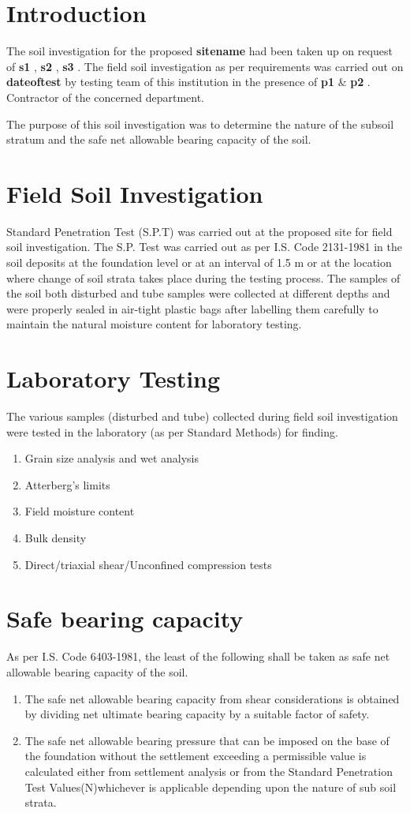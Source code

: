 \documentclass{set}
\begin{document}
\section{Introduction}
The soil investigation for the proposed \textbf{
{{sitename}}
} had been taken up on request of \textbf{
{{s1}}
},\textbf{
{{s2}}
},\textbf{
{{s3}}
}. The field soil investigation as per requirements was carried out on \textbf{
{{dateoftest}}
} by
testing team of this institution in the presence of \textbf{
{{p1}}
} \& \textbf{
{{p2}}
}. Contractor of the concerned department.\par
The purpose of this soil investigation was to determine the nature of the subsoil stratum and the safe net
allowable bearing capacity of the soil.

\section{Field Soil Investigation}
Standard Penetration Test (S.P.T) was carried out at the proposed site for field soil investigation. The S.P.
Test was carried out as per I.S. Code 2131-1981 in the soil deposits at the foundation level or at an
interval of 1.5 m or at the location where change of soil strata takes place during the testing process. The
samples of the soil both disturbed and tube samples were collected at different depths and were properly
sealed in air-tight plastic bags after labelling them carefully to maintain the natural moisture content for
laboratory testing.
\section{Laboratory Testing}
The various samples (disturbed and tube) collected during field soil investigation were tested in the
laboratory (as per Standard Methods) for finding.
\begin{enumerate}
\item {Grain size analysis and wet analysis}
\item {Atterberg's limits}
\item{Field moisture content}
\item{Bulk density}
\item{Direct/triaxial shear/Unconfined compression tests}
\end{enumerate}
\section{Safe bearing capacity}
As per I.S. Code 6403-1981, the least of the following shall be taken as safe net allowable bearing
capacity of the soil.
\begin{enumerate}
\item{The safe net allowable bearing capacity from shear considerations is obtained by dividing net
ultimate bearing capacity by a suitable factor of safety.}
\item{The safe net allowable bearing pressure that can be imposed on the base of the foundation
without the settlement exceeding a permissible value is calculated either from settlement
analysis or from the Standard Penetration Test Values(N)whichever is applicable depending
upon the nature of sub soil strata.}
\end{enumerate}
\end{document}
